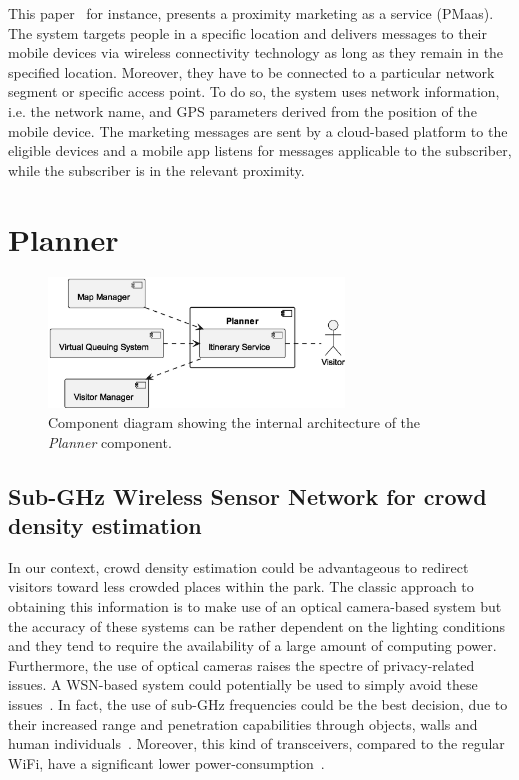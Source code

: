 This paper~\cite{mndebele2017iot} for instance, presents a proximity marketing as a service (PMaas).
The system targets people in a specific location and delivers messages to their mobile devices via wireless connectivity technology as long as they remain in the specified location.
Moreover, they have to be connected to a particular network segment or specific access point.
To do so, the system uses network information, i.e. the network name, and GPS parameters derived from the position of the mobile device.
The marketing messages are sent by a cloud-based platform to the eligible devices and a mobile app listens for messages
applicable to the subscriber, while the subscriber is in the relevant proximity.


\section{Planner}

\begin{figure}[H]
	\centering
	\includegraphics[width=0.7\textwidth]{img/planner.eps}
	\caption{Component diagram showing the internal architecture of the \textit{Planner} component.
	}
	\label{fig:planner-arch}
\end{figure}

\subsection{Sub-GHz Wireless Sensor Network for crowd density estimation}\label{subsec:sub-ghz-wireless-sensor-network-for-crowd-density-estimation}
In our context, crowd density estimation could be advantageous to redirect visitors toward less crowded places within the park.
The classic approach to obtaining this information is to make use of an optical camera-based system but the accuracy of these systems can be
rather dependent on the lighting conditions and they tend to require the availability of a large amount of computing power.
Furthermore, the use of optical cameras raises the spectre of privacy-related issues.
A WSN-based system could potentially be used to simply avoid these issues~\cite{denis2018large}.
In fact, the use of sub-GHz frequencies could be the best decision, due to their increased range and penetration capabilities through objects, walls and human individuals~\cite{denis2018large}.
Moreover, this kind of transceivers, compared to the regular WiFi, have a significant lower power-consumption~\cite{fudickar2014comparing}.

